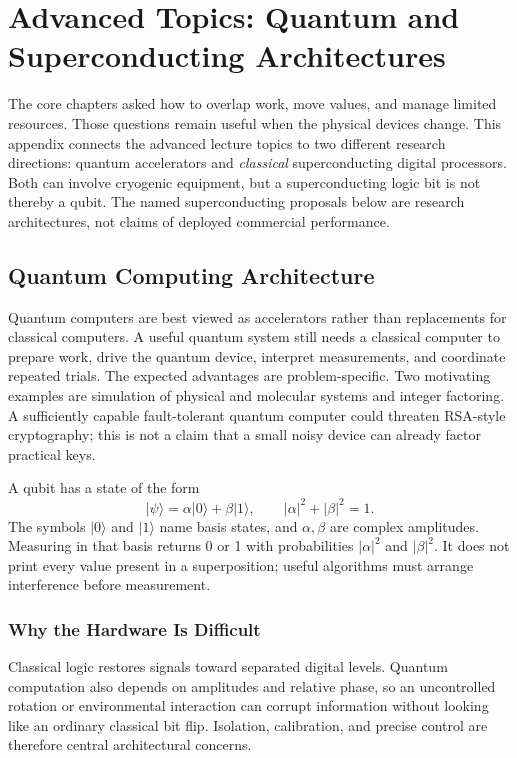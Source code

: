 \chapter[Advanced Topics]{Advanced Topics: Quantum and Superconducting Architectures}\label{ch:advanced-topics}
The core chapters asked how to overlap work, move values, and manage limited resources.
Those questions remain useful when the physical devices change.
This appendix connects the advanced lecture topics to two different research directions: quantum accelerators and \emph{classical} superconducting digital processors.
Both can involve cryogenic equipment, but a superconducting logic bit is not thereby a qubit.
The named superconducting proposals below are research architectures, not claims of deployed commercial performance.


\section{Quantum Computing Architecture}\label{sec:appd-quantum}
Quantum computers are best viewed as accelerators rather than replacements for classical computers.
A useful quantum system still needs a classical computer to prepare work, drive the quantum device, interpret measurements, and coordinate repeated trials.
The expected advantages are problem-specific.
Two motivating examples are simulation of physical and molecular systems and integer factoring.
A sufficiently capable fault-tolerant quantum computer could threaten RSA-style cryptography; this is not a claim that a small noisy device can already factor practical keys.

A qubit has a state of the form
\begin{equation}\label{eq:qubit-normalization}
    \lvert\psi\rangle=\alpha\lvert0\rangle+\beta\lvert1\rangle,
    \qquad |\alpha|^2+|\beta|^2=1.
\end{equation}
The symbols $\lvert0\rangle$ and $\lvert1\rangle$ name basis states, and $\alpha,\beta$ are complex amplitudes.
Measuring in that basis returns 0 or 1 with probabilities $|\alpha|^2$ and $|\beta|^2$.
It does not print every value present in a superposition; useful algorithms must arrange interference before measurement.

\subsection{Why the Hardware Is Difficult}\label{subsec:appd-quantum-errors}
Classical logic restores signals toward separated digital levels.
Quantum computation also depends on amplitudes and relative phase, so an uncontrolled rotation or environmental interaction can corrupt information without looking like an ordinary classical bit flip.
Isolation, calibration, and precise control are therefore central architectural concerns.

